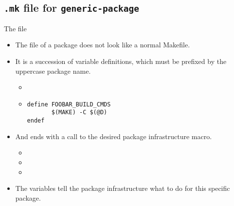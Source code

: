 \subsection{{\tt .mk} file for {\tt generic-package}}

\begin{frame}[fragile]{The  file}
  \begin{itemize}
  \item The  file of a package does not look like a normal
    Makefile.
  \item It is a succession of variable definitions, which must be
    prefixed by the uppercase package name.
    \begin{itemize}
    \item {}
    \item
\begin{verbatim}
define FOOBAR_BUILD_CMDS
       $(MAKE) -C $(@D)
endef
\end{verbatim}
    \end{itemize}
  \item And ends with a call to the desired package infrastructure
    macro.
    \begin{itemize}
    \item {}
    \item {}
    \item {}
    \end{itemize}
  \item The variables tell the package infrastructure what to do for
    this specific package.
  \end{itemize}
\end{frame}


